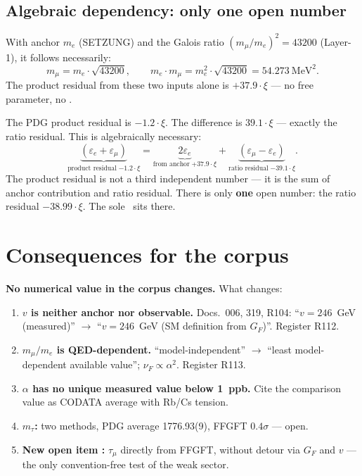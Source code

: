 \subsection*{Algebraic dependency: only one open number}

With anchor $m_e$ (SETZUNG) and the Galois ratio $(m_\mu/m_e)^2=43200$
(Layer-1), it follows necessarily:
\[
m_\mu = m_e\cdot\sqrt{43200},\qquad
m_e\cdot m_\mu = m_e^2\cdot\sqrt{43200} = 54.273~\text{MeV}^2.
\]
The product residual from these two inputs alone is $+37.9\cdot\xi$
--- no free parameter, no \SM.

The PDG product residual is $-1.2\cdot\xi$. The difference is
$39.1\cdot\xi$ --- exactly the ratio residual. This is algebraically
necessary:
\[
\underbrace{(\varepsilon_e+\varepsilon_\mu)}_{\text{product residual}\;{-1.2\cdot\xi}}
=
\underbrace{2\varepsilon_e}_{\text{from anchor}\;{+37.9\cdot\xi}}
+
\underbrace{(\varepsilon_\mu-\varepsilon_e)}_{\text{ratio residual}\;{-39.1\cdot\xi}}.
\]
The product residual is not a third independent number --- it is the sum
of anchor contribution and ratio residual. There is only \textbf{one}
open number: the ratio residual $-38.99\cdot\xi$. The sole \SM\ sits there.

\section{Consequences for the corpus}

\textbf{No numerical value in the corpus changes.} What changes:
\begin{enumerate}\itemsep2pt
\item \textbf{$v$ is neither anchor nor observable.} Docs.~006, 319, R104: ``$v=246$~GeV (measured)'' $\to$ ``$v=246$~GeV (SM definition from $G_F$)''. Register R112.
\item \textbf{$m_\mu/m_e$ is QED-dependent.} ``model-independent'' $\to$ ``least model-dependent available value''; $\nu_F\propto\alpha^2$. Register R113.
\item \textbf{$\alpha$ has no unique measured value below 1~ppb.} Cite the comparison value as CODATA average with Rb/Cs tension.
\item \textbf{$m_\tau$:} two methods, PDG average 1776.93(9), FFGFT $0.4\sigma$ --- open.
\item \textbf{New open item \SM:} $\tau_\mu$ directly from FFGFT, without detour via $G_F$ and $v$ --- the only convention-free test of the weak sector.
\end{enumerate}

